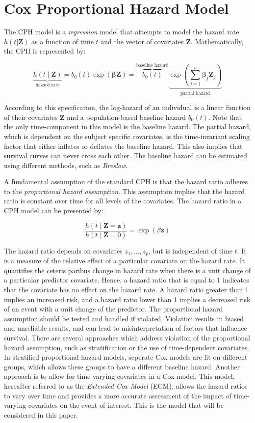 \medskip
\section{Cox Proportional Hazard Model}
\label{section:methodology:CPH}
The CPH model is a \textit{regression} model that attempts to model the hazard rate $h(t|\mathbf{Z})$ as a function of time $t$ and the vector of covariates $\mathbf{Z}$. Mathematically, the CPH is represented by: 

$$
\underbrace{h(t \mid \mathbf{Z})}_{\text{hazard rate}} =  b_0(t) \exp(\mathbf{\beta}\mathbf{Z})  = \overbrace{b_0(t)}^{\text{baseline hazard}} \underbrace{\exp \left(\sum_{j=1}^n \mathbf{\beta}_j\mathbf{Z}_j\right)}_{\text{partial hazard}}
$$

According to this specification, the log-hazard of an individual is a linear function of their covariates $\textbf{Z}$ and a population-based baseline hazard $b_{0}(t)$. Note that the only time-component in this model is the baseline hazard. The partial hazard, which is dependent on the subject specific covariates, is the time-invariant scaling factor that either inflates or deflates the baseline hazard. This also implies that survival curves can never cross each other. The baseline hazard can be estimated using different methods, such as \textit{Breslow}. %

A fundamental assumption of the standard CPH is that the hazard ratio adheres to the \textit{proportional hazard assumption}. This assumption implies that the hazard ratio is constant over time for all levels of the covariates. The hazard ratio in a CPH model can be presented by: 

$$\frac{h(t \mid \textbf{Z} = \textbf{z})}{h(t \mid \textbf{Z} = 0)} = \exp(\beta \textbf{z})$$

The hazard ratio depends on covariates $z_1, ..., z_p$, but is independent of time $t$. It is a measure of the relative effect of a particular covariate on the hazard rate. It quantifies the ceteris paribus change in hazard rate when there is a unit change of a particular predictor covariate. Hence, a hazard ratio that is equal to 1 indicates that the covariate has no effect on the hazard rate. A hazard ratio greater than 1 implies an increased risk, and a hazard ratio lower than 1 implies a decreased risk of an event with a unit change of the predictor. The proportional hazard assumption should be tested and handled if violated. %
Violation results in biased and unreliable results, and can lead to misinterpretation of factors that influence survival. There are several approaches which address violation of the proportional hazard assumption, such as stratification or the use of time-dependent covariates. In stratified proportional hazard models, seperate Cox models are fit on different groups, which allows these groups to have a different baseline hazard. Another approach is to allow for time-varying covariates in a Cox model. This model, hereafter referred to as the \textit{Extended Cox Model} (ECM), allows the hazard ratios to vary over time and provides a more accurate assessment of the impact of time-varying covariates on the event of interest. This is the model that will be considered in this paper. 

